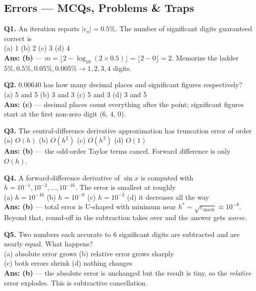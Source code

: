 \subsection{Errors --- MCQs, Problems \& Traps}

\begin{mcqbox}
\textbf{Q1.} An iteration reports $|\epsilon_a| = 0.5\%$. The number of significant digits guaranteed correct is\\
(a) 1 \quad (b) 2 \quad (c) 3 \quad (d) 4\\
\textbf{Ans: (b)} --- $m=\lfloor 2-\log_{10}(2\times0.5)\rfloor = \lfloor 2-0\rfloor = 2$. Memorize the ladder $5\%,0.5\%,0.05\%,0.005\% \to 1,2,3,4$ digits.

\textbf{Q2.} $0.00640$ has how many decimal places and significant figures respectively?\\
(a) 5 and 5 \quad (b) 3 and 3 \quad (c) 5 and 3 \quad (d) 3 and 5\\
\textbf{Ans: (c)} --- decimal places count everything after the point; significant figures start at the first non-zero digit (6, 4, 0).

\textbf{Q3.} The central-difference derivative approximation has truncation error of order\\
(a) $O(h)$ \quad (b) $O(h^2)$ \quad (c) $O(h^3)$ \quad (d) $O(1)$\\
\textbf{Ans: (b)} --- the odd-order Taylor terms cancel. Forward difference is only $O(h)$.

\textbf{Q4.} A forward-difference derivative of $\sin x$ is computed with $h = 10^{-1}, 10^{-2},\dots,10^{-16}$. The error is smallest at roughly\\
(a) $h=10^{-16}$ \quad (b) $h=10^{-8}$ \quad (c) $h=10^{-2}$ \quad (d) it decreases all the way\\
\textbf{Ans: (b)} --- total error is U-shaped with minimum near $h^\ast\sim\sqrt{\varepsilon_{\text{mach}}}\approx10^{-8}$. Beyond that, round-off in the subtraction takes over and the answer gets \emph{worse}.

\textbf{Q5.} Two numbers each accurate to 6 significant digits are subtracted and are nearly equal. What happens?\\
(a) absolute error grows \quad (b) relative error grows sharply \\
(c) both errors shrink \quad (d) nothing changes\\
\textbf{Ans: (b)} --- the absolute error is unchanged but the result is tiny, so the \emph{relative} error explodes. This is subtractive cancellation.


\end{mcqbox}
